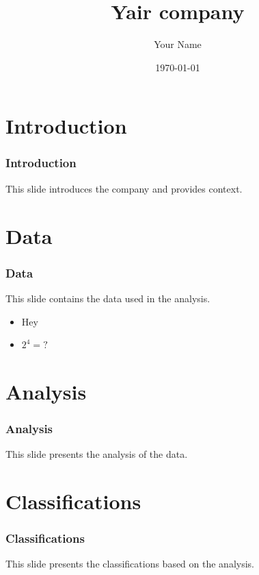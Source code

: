 \documentclass{beamer}%
\title{Yair company}%
\author{Your Name}%
\date{\today}%
\begin{document}
%
\normalsize%
\maketitle%
\section{Introduction}%
\label{sec:Introduction}%
\begin{frame}%
\frametitle{Introduction}%
This slide introduces the company and provides context.%
\end{frame}

%
\section{Data}%
\label{sec:Data}%
\begin{frame}%
\frametitle{Data}%
This slide contains the data used in the analysis.%
\begin{itemize}%
\item Hey%
\item $2^4 = ?$%
\end{itemize}%
\end{frame}

%
\section{Analysis}%
\label{sec:Analysis}%
\begin{frame}%
\frametitle{Analysis}%
This slide presents the analysis of the data.%
\end{frame}

%
\section{Classifications}%
\label{sec:Classifications}%
\begin{frame}%
\frametitle{Classifications}%
This slide presents the classifications based on the analysis.%
\end{frame}

%
\end{document}
